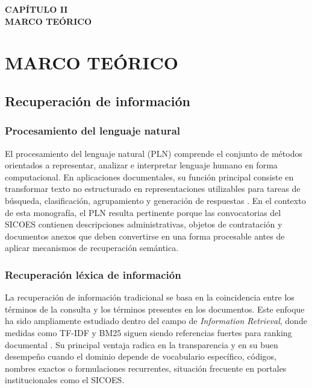 \newpage
\thispagestyle{empty}
\vspace*{0.35\textheight}
\begin{center}
    {\Huge\textbf{CAPÍTULO II}} \\[0.5cm]
    {\Huge\textbf{MARCO TEÓRICO}}
\end{center}

\newpage
\chapter{MARCO TEÓRICO}

\section{Recuperación de información}

\subsection{Procesamiento del lenguaje natural}

El procesamiento del lenguaje natural (PLN) comprende el conjunto de métodos orientados a representar, analizar e interpretar lenguaje humano en forma computacional. En aplicaciones documentales, su función principal consiste en transformar texto no estructurado en representaciones utilizables para tareas de búsqueda, clasificación, agrupamiento y generación de respuestas \parencite{jurafsky2025, manning2008ir}. En el contexto de esta monografía, el PLN resulta pertinente porque las convocatorias del SICOES contienen descripciones administrativas, objetos de contratación y documentos anexos que deben convertirse en una forma procesable antes de aplicar mecanismos de recuperación semántica.

\subsection{Recuperación léxica de información}

La recuperación de información tradicional se basa en la coincidencia entre los términos de la consulta y los términos presentes en los documentos. Este enfoque ha sido ampliamente estudiado dentro del campo de \textit{Information Retrieval}, donde medidas como TF-IDF y BM25 siguen siendo referencias fuertes para ranking documental \parencite{manning2008ir, robertson2009bm25}. Su principal ventaja radica en la transparencia y en su buen desempeño cuando el dominio depende de vocabulario específico, códigos, nombres exactos o formulaciones recurrentes, situación frecuente en portales institucionales como el SICOES.

